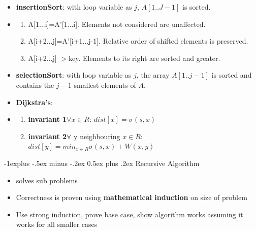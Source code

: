\documentclass[10pt, landscape]{article}
\makeatletter
\renewcommand{\subsection}{\@startsection{subsection}{2}{0mm}%
  {-1explus -.5ex minus -.2ex}%
  {0.5ex plus .2ex}%
{\normalfont\normalsize\bfseries}}
\makeatother
\begin{document}
\begin{multicols*}{4}
  \begin{itemize}
    \item \textbf{insertionSort}: with loop variable as $j$, $A[1..J-1]$ is sorted.
    \item[] \begin{enumerate}
      \item A[1...i]=A'[1...i]. Elements not considered are unaffected.
      \item A[i+2...j]=A'[i+1...j-1]. Relative order of shifted elements is preserved.
      \item A[i+2...j] $>$key. Elements to its right are sorted and greater.
    \end{enumerate}
    \item \textbf{selectionSort}: with loop variable as $j$, the array $A[1..j-1]$ is sorted and contains the $j-1$ smallest elements of $A$.

    \item \textbf{Dijkstra's}:
    \item[] \begin{niceproof} 
      \begin{enumerate}
        \item \textbf{invariant 1}$\forall x \in R$: $dist[x] = \sigma(s,x)$
        \item \textbf{invariant 2}$\forall$ y neighbouring $x\in R$: $dist[y]=min_{x\in R}\sigma(s,x)+W(x,y)$
      \end{enumerate}
    \end{niceproof}
  \end{itemize}

\subsection{Recursive Algorithm}
\begin{itemize}
  \item {} solves sub problems
  \item Correctness is proven using \textbf{mathematical induction} on size of problem
  \item Use strong induction, prove base case, show algorithm works assuming it works for all smaller cases
\end{itemize}


\end{multicols*}
\end{document}
